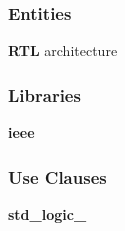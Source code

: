 \subsubsection*{Entities}
\begin{DoxyCompactItemize}
\item 
{\bf R\+TL} architecture
\end{DoxyCompactItemize}
\subsubsection*{Libraries}
 \begin{DoxyCompactItemize}
\item 
{\bf ieee} 
\end{DoxyCompactItemize}
\subsubsection*{Use Clauses}
 \begin{DoxyCompactItemize}
\item 
{\bf std\+\_\+logic\+\_}   
\end{DoxyCompactItemize}

